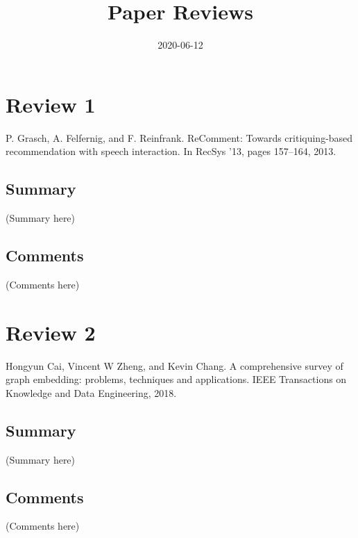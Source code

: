 \documentclass{article}
\begin{document}
\title{Paper Reviews}
\date{2020-06-12}
\maketitle

\section*{Review 1}
P. Grasch, A. Felfernig, and F. Reinfrank. ReComment: Towards
critiquing-based recommendation with speech interaction. In RecSys ’13,
pages 157–164, 2013.

\subsection*{Summary}
(Summary here)\\

\subsection*{Comments}
(Comments here)

\section*{Review 2}
Hongyun Cai, Vincent W Zheng, and Kevin Chang. A comprehensive survey of graph
embedding: problems, techniques and applications. IEEE Transactions on
Knowledge and Data Engineering, 2018.

\subsection*{Summary}
(Summary here)

\subsection*{Comments}
(Comments here)
\end{document}
